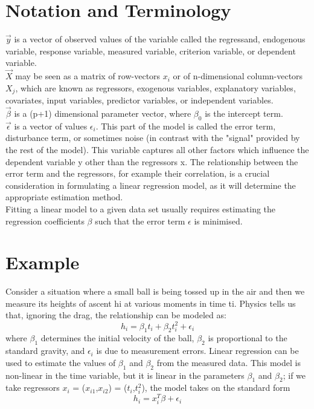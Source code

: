 \documentclass[a4paper, 12pt]{report}
\begin{document}
\section{Notation and Terminology}
$\vec{y}$ is a vector of observed values of the variable called the regressand, endogenous variable, response variable, measured variable, criterion variable, or dependent variable. \\
$\vec{X}$ may be seen as a matrix of row-vectors ${x} _{i}$ or of n-dimensional column-vectors $X_{j}$, which are known as regressors, exogenous variables, explanatory variables, covariates, input variables, predictor variables, or independent variables. \\
$\vec{\beta}$ is a (p+1) dimensional parameter vector, where $\beta_{0}$ is the intercept term.\\
$\vec{\epsilon}$ is a vector of values $\epsilon_{i}$. This part of the model is called the error term, disturbance term, or sometimes noise (in contrast with the "signal" provided by the rest of the model). This variable captures all other factors which influence the dependent variable y other than the regressors x. The relationship between the error term and the regressors, for example their correlation, is a crucial consideration in formulating a linear regression model, as it will determine the appropriate estimation method.\\
Fitting a linear model to a given data set usually requires estimating the regression coefficients $\beta$ such that the error term $\epsilon$ is minimised.
\section{Example}
Consider a situation where a small ball is being tossed up in the air and then we measure its heights of ascent hi at various moments in time ti. Physics tells us that, ignoring the drag, the relationship can be modeled as:
\begin{equation}
  h_{i} = \beta_{1} t_{i} + \beta_{2} t_{i}^{2} + \epsilon_{i}
\end{equation} 
where $\beta_{1}$ determines the initial velocity of the ball, $\beta_{2}$  is proportional to the standard gravity, and $\epsilon_{i}$ is due to measurement errors. Linear regression can be used to estimate the values of
$\beta_{1}$ and $\beta_{2}$ from the measured data. This model is non-linear in the time variable, but it is linear in the parameters $\beta_{1}$ and $\beta_{2}$; if we take regressors $x_{i}$ = ($x_{i1}$,$x_{i2}$) = ($t_{i}$,$t_{i}^{2}$), the model takes on the standard form
\begin{equation}
  h_{i} = x_{i}^{T} \beta + \epsilon_{i}
\end{equation} 
\end{document}
